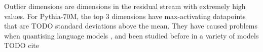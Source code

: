 Outlier dimensions are dimensions in the residual stream with extremely high values. For Pythia-70M, the top 3 dimensions have max-activating datapoints that are TODO standard deviations above the mean. They have caused problems when quantising language models \citep{dettmers2022llmint8}, and been studied before in a variety of models TODO cite
